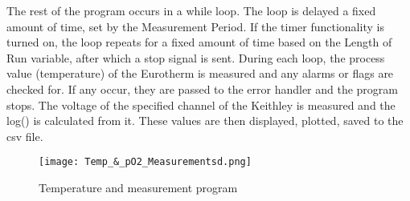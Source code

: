     The rest of the program occurs in a while loop.
    The loop is delayed a fixed amount of time, set by the Measurement Period.
    If the timer functionality is turned on, the loop repeats for a fixed amount of time based on the Length of Run variable, after which a stop signal is sent.
    During each loop, the process value (temperature) of the Eurotherm is measured and any alarms or flags are checked for.
    If any occur, they are passed to the error handler and the program stops.
    The voltage of the specified channel of the Keithley is measured and the log() is calculated from it.
    These values are then displayed, plotted, saved to the csv file.

    \begin{landscape}%
        \begin{figure}
            \begin{center}
            \texttt{[image: Temp\_\&\_pO2\_Measurementsd.png]}
            \end{center}
            \caption{Temperature and  measurement program}
            \label{fig:tempvi}
        \end{figure}
    \end{landscape}
